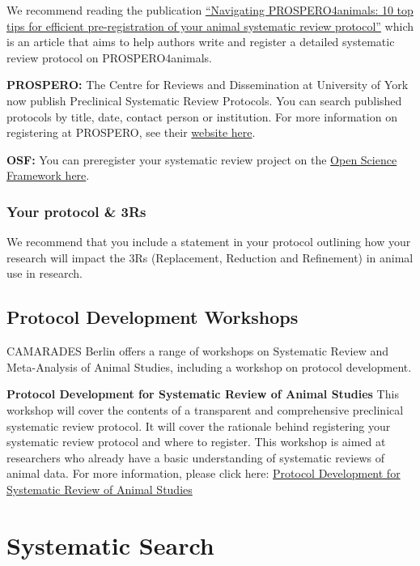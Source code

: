 \documentclass[
]{book}
\begin{document}
We recommend reading the publication \href{https://link.springer.com/article/10.1186/s12874-024-02146-0}{``Navigating PROSPERO4animals: 10 top tips for efficient pre-registration of your animal systematic review protocol''} which is an article that aims to help authors write and register a detailed systematic review protocol on PROSPERO4animals.

\textbf{PROSPERO:}
The Centre for Reviews and Dissemination at University of York now publish Preclinical Systematic Review Protocols. You can search published protocols by title, date, contact person or institution.
For more information on registering at PROSPERO, see their \href{https://www.crd.york.ac.uk/prospero/}{website here}.

\textbf{OSF:}
You can preregister your systematic review project on the \href{https://osf.io/prereg/}{Open Science Framework here}.

\subsection{Your protocol \& 3Rs}\label{your-protocol-3rs}

We recommend that you include a statement in your protocol outlining how your research will impact the 3Rs (Replacement, Reduction and Refinement) in animal use in research.

\section{Protocol Development Workshops}\label{protocol-development-workshops}

CAMARADES Berlin offers a range of workshops on Systematic Review and Meta-Analysis of Animal Studies, including a workshop on protocol development.

\textbf{Protocol Development for Systematic Review of Animal Studies}
This workshop will cover the contents of a transparent and comprehensive preclinical systematic review protocol. It will cover the rationale behind registering your systematic review protocol and where to register. This workshop is aimed at researchers who already have a basic understanding of systematic reviews of animal data. For more information, please click here: \href{https://www.bihealth.org/en/translation/innovation-enabler/quest-center/events/course/protocol-development-for-systematic-review-of-animal-studies}{Protocol Development for Systematic Review of Animal Studies}

\chapter{Systematic Search}\label{systematic-search}
\end{document}
